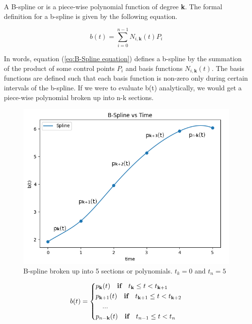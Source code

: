 \documentclass{article}
\begin{document}
 A B-spline or  is a piece-wise polynomial function of degree \textbf{k}. The formal definition for a b-spline is given by the following equation.
 
  \begin{equation} \label{eq:B-Spline equation}
      b(t) = \sum^{n-1}_{i=0} N_{i,\textbf{k}}(t) P_i
  \end{equation}
 
In words, equation (\ref{eq:B-Spline equation}) defines a b-spline by the summation of the product of some control points \(P_i\) and basis functions \(N_{i,\textbf{k}}(t)\). The basis functions are defined such that each basis function is non-zero only during certain intervals of the b-spline. If we were to evaluate b(t) analytically, we would get a piece-wise polynomial broken up into n-k sections.

\begin{figure}[H]
\begin{center}
\includegraphics[scale=.55]{BsplineVsTime.png}
\end{center}
\caption{B-spline broken up into 5 sections or polynomials. \(t_k = 0\) and \(t_{n} = 5\)}
\label{Fig:B-splines vs time}
\end{figure}

 \begin{equation}
     b(t) = \begin{dcases} 
                p_{\textbf{k}}(t) \quad \textbf{if} \quad t_{\textbf{k}} \leq t < t_{\textbf{k}+1} \\ 
                p_{\textbf{k}+1}(t) \quad \textbf{if} \quad t_{\textbf{k}+1} \leq t < t_{\textbf{k}+2} \\
                \quad ... \\
                p_{n-\textbf{k}}(t)  \quad \textbf{if} \quad t_{n-1} \leq t < t_{n}
            \end{dcases} 
 \end{equation}
\end{document}
